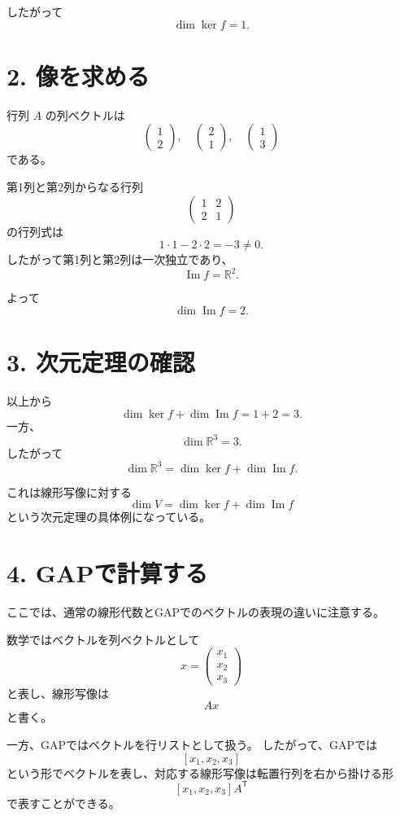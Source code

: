 \documentclass[a4paper,11pt]{ltjsarticle}
\begin{document}
したがって
\[
\dim\ker f=1.
\]

\section*{2. 像を求める}

行列 $A$ の列ベクトルは
\[
\begin{pmatrix}1\\2\end{pmatrix},
\quad
\begin{pmatrix}2\\1\end{pmatrix},
\quad
\begin{pmatrix}1\\3\end{pmatrix}
\]
である。

第1列と第2列からなる行列
\[
\begin{pmatrix}
1&2\\
2&1
\end{pmatrix}
\]
の行列式は
\[
1\cdot1-2\cdot2=-3\neq0.
\]
したがって第1列と第2列は一次独立であり、
\[
\operatorname{Im}f=\mathbb{R}^2.
\]

よって
\[
\boxed{\dim\operatorname{Im}f=2}.
\]

\section*{3. 次元定理の確認}

以上から
\[
\dim\ker f+\dim\operatorname{Im}f
=1+2=3.
\]
一方、
\[
\dim\mathbb{R}^3=3.
\]
したがって
\[
\boxed{
\dim\mathbb{R}^3
=
\dim\ker f+\dim\operatorname{Im}f
}.
\]

これは線形写像に対する
\[
\boxed{\dim V=\dim\ker f+\dim\operatorname{Im}f}
\]
という次元定理の具体例になっている。

\section*{4. GAPで計算する}

ここでは、通常の線形代数とGAPでのベクトルの表現の違いに注意する。

数学ではベクトルを列ベクトルとして
\[
x=
\begin{pmatrix}
x_1\\x_2\\x_3
\end{pmatrix}
\]
と表し、線形写像は
\[
Ax
\]
と書く。

一方、GAPではベクトルを行リストとして扱う。
したがって、GAPでは
\[
[x_1,x_2,x_3]
\]
という形でベクトルを表し、対応する線形写像は転置行列を右から掛ける形
\[
[x_1,x_2,x_3]A^{\mathsf T}
\]
で表すことができる。
\end{document}
